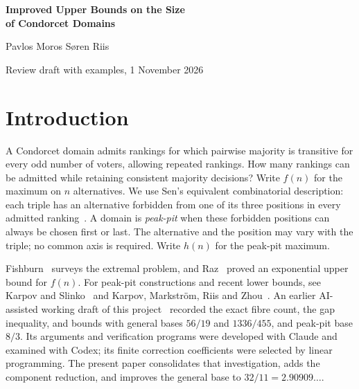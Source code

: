 \documentclass[11pt,letterpaper]{article}
\theoremstyle{definition}
\begin{document}
\begin{center}
{\Large\bfseries Improved Upper Bounds on the Size\\[2pt]
of Condorcet Domains}\par
\medskip
Pavlos Moros \qquad S\o ren Riis\par
\small Review draft with examples, 1 November 2026
\end{center}
\begin{abstract}
We prove \(f(n)\leq32n f(n-1)/(11n+8)\) for the maximum size of a
Condorcet domain, giving exponential base \(32/11<3\).
An exact deletion count, a decomposition into adjacent-swap components
and a local counting inequality give the bound; the same local
inequality gives base \(8/3\) for peak-pit domains.
Small examples illustrate the structural counts. All proofs and the
complete finite computation, including its exact data and coverage
argument, are included in the paper and appendices.
\end{abstract}

\section{Introduction}\label{sec:introduction}
A Condorcet domain admits rankings for which pairwise majority is
transitive for every odd number of voters, allowing repeated rankings.
How many rankings can be admitted while retaining consistent majority
decisions? Write \(f(n)\) for the maximum on \(n\) alternatives.
We use Sen's equivalent combinatorial description: each triple has
an alternative forbidden from one of its three positions in every
admitted ranking~\cite{Sen}. A domain is \emph{peak-pit} when these
forbidden positions can always be chosen first or last. The alternative
and the position may vary with the triple; no common axis is required.
Write \(h(n)\) for the peak-pit maximum.

Fishburn~\cite{Fishburn} surveys the extremal problem, and
Raz~\cite{Raz} proved an exponential upper bound for \(f(n)\).
For peak-pit constructions and recent lower bounds, see Karpov and
Slinko~\cite{KarpovSlinko} and Karpov, Markstr\"om, Riis and
Zhou~\cite{KMRZ}. An earlier AI-assisted working draft of this
project~\cite{Moros} recorded the exact fibre count, the gap inequality,
and bounds with general bases \(56/19\) and \(1336/455\), and peak-pit
base \(8/3\). Its arguments and verification programs were developed
with Claude and examined with Codex; its finite correction coefficients
were selected by linear programming. The present paper consolidates
that investigation, adds the component reduction, and improves the
general base to \(32/11=2.90909\ldots\).
\end{document}
